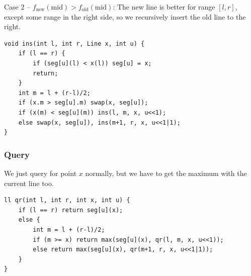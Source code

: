 Case 2 -- $f_\text{new}(\text{mid}) > f_\text{old}(\text{mid})$: The new line is better for range $[l, r]$, except some range in the right side, so we recursively insert the old line to the right.

\begin{lstlisting}
void ins(int l, int r, Line x, int u) {
    if (l == r) {
        if (seg[u](l) < x(l)) seg[u] = x;
        return;
    }
    int m = l + (r-l)/2;
    if (x.m > seg[u].m) swap(x, seg[u]);
    if (x(m) < seg[u](m)) ins(l, m, x, u<<1);
    else swap(x, seg[u]), ins(m+1, r, x, u<<1|1);
}
\end{lstlisting}

\subsubsection{Query}

We just query for point $x$ normally, but we have to get the maximum with the current line too.

\begin{lstlisting}
ll qr(int l, int r, int x, int u) {
    if (l == r) return seg[u](x);
    else {
        int m = l + (r-l)/2;
        if (m >= x) return max(seg[u](x), qr(l, m, x, u<<1));
        else return max(seg[u](x), qr(m+1, r, x, u<<1|1));
    }
}
\end{lstlisting}

\break